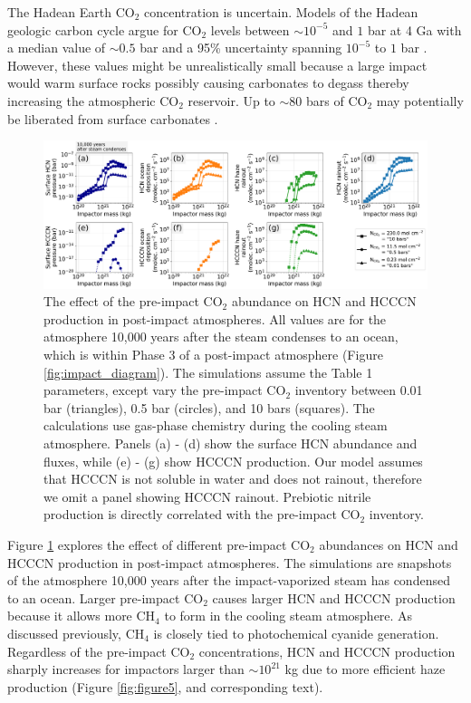 The Hadean Earth CO$_2$ concentration is uncertain. Models of the Hadean geologic carbon cycle argue for CO$_2$ levels between $\sim 10^{-5}$ and $1$ bar at 4 Ga with a median value of $\sim 0.5$ bar and a 95\% uncertainty spanning $10^{-5}$ to $1$ bar \citep{Kadoya_2020}. However, these values might be unrealistically small because a large impact would warm surface rocks possibly causing carbonates to degass thereby increasing the atmospheric CO$_2$ reservoir. Up to $\sim 80$ bars of CO$_2$ may potentially be liberated from surface carbonates \citep{KrissansenTotton_2021}.

\begin{figure}
  \centering
  \includegraphics[width=1.0\textwidth]{tex/5impacts/figures/Figure6.pdf}
  \caption{The effect of the pre-impact CO$_2$ abundance on HCN and HCCCN production in post-impact atmospheres. All values are for the atmosphere 10,000 years after the steam condenses to an ocean, which is within Phase 3 of a post-impact atmosphere (Figure \ref{fig:impact_diagram}). The simulations assume the Table 1 parameters, except vary the pre-impact CO$_2$ inventory between 0.01 bar (triangles), 0.5 bar (circles), and 10 bars (squares). The calculations use gas-phase chemistry during the cooling steam atmosphere. Panels (a) - (d) show the surface HCN abundance and fluxes, while (e) - (g) show HCCCN production. Our model assumes that HCCCN is not soluble in water and does not rainout, therefore we omit a panel showing HCCCN rainout. Prebiotic nitrile production is directly correlated with the pre-impact CO$_2$ inventory.}
  \label{fig:figure6}
\end{figure}

Figure \ref{fig:figure6} explores the effect of different pre-impact CO$_2$ abundances on HCN and HCCCN production in post-impact atmospheres. The simulations are snapshots of the atmosphere 10,000 years after the impact-vaporized steam has condensed to an ocean. Larger pre-impact CO$_2$ causes larger HCN and HCCCN production because it allows more CH$_4$ to form in the cooling steam atmosphere. As discussed previously, CH$_4$ is closely tied to photochemical cyanide generation. Regardless of the pre-impact CO$_2$ concentrations, HCN and HCCCN production sharply increases for impactors larger than $\sim 10^{21}$ kg due to more efficient haze production (Figure \ref{fig:figure5}, and corresponding text).

